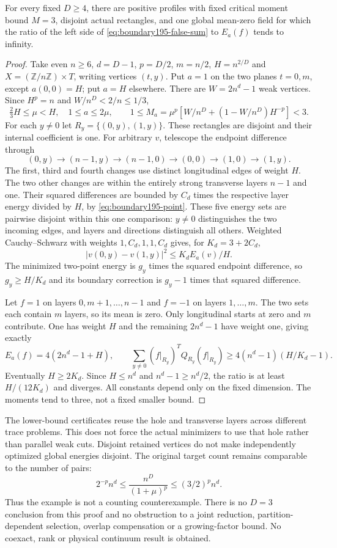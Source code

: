 \begin{theorem}\label{thm:boundary195-aggregate}
For every fixed $D\ge4$, there are positive profiles with fixed critical
moment bound $M=3$, disjoint actual rectangles, and one global mean-zero
field for which the ratio of the left side of
\eqref{eq:boundary195-false-sum} to $E_a(f)$ tends to infinity.
\end{theorem}
\begin{proof}
Take even $n\ge6$, $d=D-1$, $p=D/2$, $m=n/2$, $H=n^{2/D}$ and
$X=(\mathbb Z/n\mathbb Z)\times T$, writing vertices $(t,y)$.
Put $a=1$ on the two planes $t=0,m$, except $a(0,0)=H$; put $a=H$
elsewhere. There are $W=2n^d-1$ weak vertices. Since $H^p=n$ and
$W/n^D<2/n\le1/3$,
\[
 \tfrac23H\le\mu<H,\quad1\le a\le2\mu,\qquad
 1\le M_a=\mu^p[W/n^D+(1-W/n^D)H^{-p}]<3.
\]
For each $y\ne0$ let $R_y=\{(0,y),(1,y)\}$. These rectangles are
disjoint and their internal coefficient is one. For arbitrary $v$,
telescope the endpoint difference through
\[
 (0,y)\to(n-1,y)\to(n-1,0)\to(0,0)\to(1,0)\to(1,y).
\]
The first, third and fourth changes use distinct longitudinal edges of
weight $H$. The two other changes are within the entirely strong
transverse layers $n-1$ and one. Their squared differences are bounded by
$C_d$ times the respective layer energy divided by $H$, by
\eqref{eq:boundary195-point}. These five energy sets are pairwise disjoint
within this one comparison: $y\ne0$ distinguishes the two incoming edges,
and layers and directions distinguish all others. Weighted Cauchy--Schwarz
with weights $1,C_d,1,1,C_d$ gives, for $K_d=3+2C_d$,
\[
 |v(0,y)-v(1,y)|^2\le K_d E_a(v)/H.
\]
The minimized two-point energy is $g_y$ times the squared endpoint
difference, so $g_y\ge H/K_d$ and its boundary correction is $g_y-1$
times that squared difference.

Let $f=1$ on layers $0,m+1,\ldots,n-1$ and $f=-1$ on layers
$1,\ldots,m$. The two sets each contain $m$ layers, so its mean is zero.
Only longitudinal starts at zero and $m$ contribute. One has weight $H$
and the remaining $2n^d-1$ have weight one, giving exactly
\[
 E_a(f)=4(2n^d-1+H),\qquad
 \sum_{y\ne0}(f|_{R_y})^TQ_{R_y}(f|_{R_y})
 \ge4(n^d-1)(H/K_d-1).
\]
Eventually $H\ge2K_d$. Since $H\le n^d$ and $n^d-1\ge n^d/2$, the
ratio is at least $H/(12K_d)$ and diverges. All constants depend only on
the fixed dimension. The moments tend to three, not a fixed smaller bound.
\end{proof}

The lower-bound certificates reuse the hole and transverse layers across
different trace problems. This does not force the actual minimizers to
use that hole rather than parallel weak cuts. Disjoint retained vertices
do not make independently optimized global energies disjoint.
The original target count remains comparable to the number of pairs:
\[
 2^{-p}n^d\le\frac{n^D}{(1+\mu)^p}\le(3/2)^p n^d.
\]
Thus the example is not a counting counterexample. There is no $D=3$
conclusion from this proof and no obstruction to a joint reduction,
partition-dependent selection, overlap compensation or a growing-factor
bound. No coexact, rank or physical continuum result is obtained.

